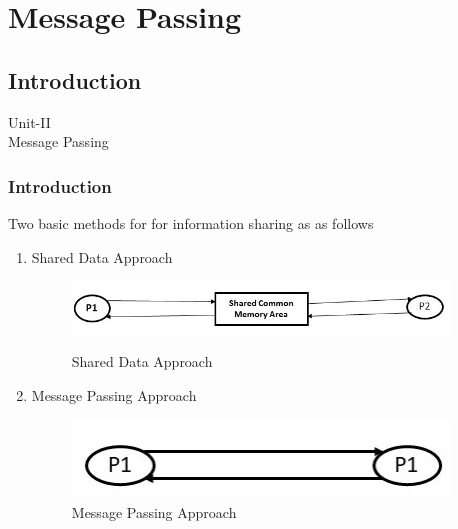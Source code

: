 \documentclass{beamer}
\begin{document}
\section{Message Passing}

\subsection{Introduction}
\begin{frame}
	\centering
	\large Unit-II\\
	\huge Message Passing
\end{frame}


\begin{frame}
	\frametitle{Introduction}
		Two basic methods for for information sharing as as follows
		\begin{enumerate}
		\item Shared Data Approach\\
		\begin{figure}
			\centering
			\includegraphics[width=10cm]{sharedDataApproach.jpg}\\
			\caption{Shared Data Approach}
		\end{figure}
		\item Message Passing Approach\\
		\begin{figure}
			\centering
			\includegraphics[width=10cm]{messagePassingApproach.jpg}
			\caption{Message Passing Approach}
		\end{figure}
		\end{enumerate}
\end{frame}
\end{document}
